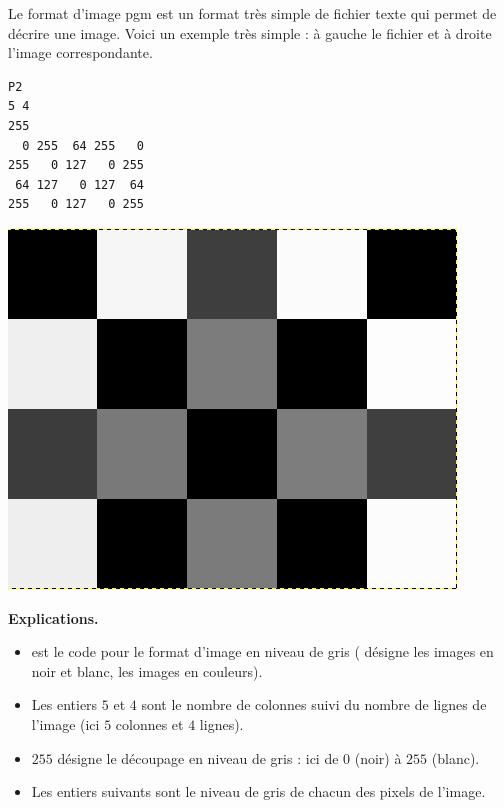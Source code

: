 \documentclass[11pt,class=report,crop=false]{standalone}
\begin{document}
\begin{cours}
	


Le format d'image \og{}pgm\fg{}	est un format très simple de fichier texte qui permet de décrire une image.
Voici un exemple très simple : à gauche le fichier et à droite l'image correspondante.

\begin{center}
\begin{minipage}{0.4\textwidth}
\begin{lstlisting}
P2
5 4
255
  0 255  64 255   0
255   0 127   0 255
 64 127   0 127  64
255   0 127   0 255
\end{lstlisting}
\end{minipage}	
\begin{minipage}{0.4\textwidth}
\includegraphics[scale=\myscale,scale=0.3]{ecran-cours-pgm}
\end{minipage}
\end{center}

\textbf{Explications.}
\begin{itemize}
	\item {} est le code pour le format d'image en niveau de gris ( désigne les images en noir et blanc,  les images en couleurs).
	\item Les entiers $5$ et $4$ sont le nombre de colonnes suivi du nombre de lignes de l'image (ici $5$ colonnes et $4$ lignes).
	\item $255$ désigne le découpage en niveau de gris : ici de $0$ (noir) à $255$ (blanc).
	\item Les entiers suivants sont le niveau de gris de chacun des pixels de l'image.
\end{itemize}


\end{cours}
\end{document}
